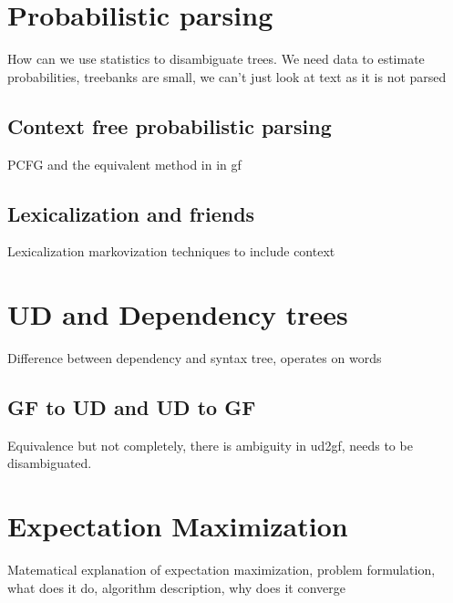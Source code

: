 \section{Probabilistic parsing}
How can we use statistics to disambiguate trees. We need data to estimate probabilities, treebanks are small, we can't just look at text as it is not parsed
\subsection{Context free probabilistic parsing}
PCFG and the equivalent method in in gf
\subsection{Lexicalization and friends}
Lexicalization markovization techniques to include context
\section{UD and Dependency trees}
Difference between dependency and syntax tree, operates on words
\subsection{GF to UD and UD to GF}
Equivalence but not completely, there is ambiguity in ud2gf, needs to be disambiguated.
\section{Expectation Maximization}
Matematical explanation of expectation maximization, problem formulation, what does it do, algorithm description, why does it converge






%    
